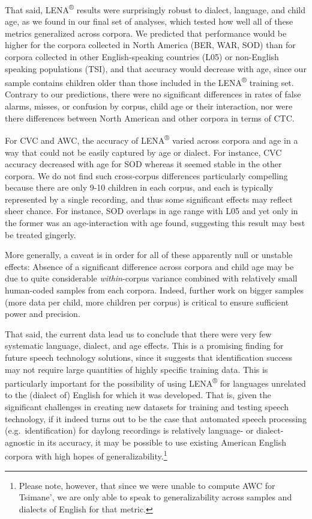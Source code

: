 \documentclass[english,table,man,floatsintext]{apa6}
\let\rmarkdownfootnote\footnote%
\def\footnote{\protect\rmarkdownfootnote}
\begin{document}
That said, LENA\textsuperscript{®} results were surprisingly robust to dialect, language, and child age, as we found in our final set of analyses, which tested how well all of these metrics generalized across corpora. We predicted that performance would be higher for the corpora collected in North America (BER, WAR, SOD) than for corpora collected in other English-speaking countries (L05) or non-English speaking populations (TSI), and that accuracy would decrease with age, since our sample contains children older than those included in the LENA\textsuperscript{®} training set. Contrary to our predictions, there were no significant differences in rates of false alarms, misses, or confusion by corpus, child age or their interaction, nor were there differences between North American and other corpora in terms of CTC.

For CVC and AWC, the accuracy of LENA\textsuperscript{®} varied across corpora and age in a way that could not be easily captured by age or dialect. For instance, CVC accuracy decreased with age for SOD whereas it seemed stable in the other corpora. We do not find such cross-corpus differences particularly compelling because there are only 9-10 children in each corpus, and each is typically represented by a single recording, and thus some significant effects may reflect sheer chance. For instance, SOD overlaps in age range with L05 and yet only in the former was an age-interaction with age found, suggesting this result may best be treated gingerly.

More generally, a caveat is in order for all of these apparently null or unstable effects: Absence of a significant difference across corpora and child age may be due to quite considerable \emph{within}-corpus variance combined with relatively small human-coded samples from each corpora. Indeed, further work on bigger samples (more data per child, more children per corpus) is critical to ensure sufficient power and precision.

That said, the current data lead us to conclude that there were very few systematic language, dialect, and age effects. This is a promising finding for future speech technology solutions, since it suggests that identification success may not require large quantities of highly specific training data. This is particularly important for the possibility of using LENA\textsuperscript{®} for languages unrelated to the (dialect of) English for which it was developed. That is, given the significant challenges in creating new datasets for training and testing speech technology, if it indeed turns out to be the case that automated speech processing (e.g.~identification) for daylong recordings is relatively language- or dialect-agnostic in its accuracy, it may be possible to use existing American English corpora with high hopes of generalizability.\footnote{Please note, however, that since we were unable to compute AWC for Tsimane', we are only able to speak to generalizability across samples and dialects of English for that metric.}
\end{document}
